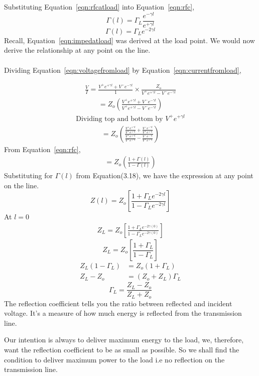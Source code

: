 Substituting Equation~\ref{eqn:rfcatload} into Equation~\ref{eqn:rfc},
\begin{equation*}
\Gamma (l) = \Gamma_L\frac{e^{-\gamma l}}{e^{+\gamma l}}
\end{equation*}
\begin{equation}
\Gamma (l) = \Gamma_L e^{-2\gamma l}
\end{equation}
Recall, Equation~\ref{eqn:impedatload} was derived at the load point. We would now derive the relationship at any point on the line. \\ \\
Dividing Equation~\ref{eqn:voltagefromload} by Equation~\ref{eqn:currentfromload},

\begin{align*}
\frac{V}{I} = \frac{V^+e^{+\gamma l}+V^-e^{-\gamma l}}{1}\times \frac{Z_o}{V^+e^{+\gamma l}-V^-e^{-\gamma l}}
\end{align*}
\begin{align*}
= Z_o\left( \frac{V^+e^{+\gamma l}+V^-e^{-\gamma l}}{V^+e^{+\gamma l}-V^-e^{-\gamma l}}\right) 
\end{align*}
\begin{align*}
\text{Dividing top and bottom by }V^+e^{+\gamma l}
\end{align*}
\begin{align*}
= Z_o\left( \frac{\frac{V^+e^{+\gamma l}}{V^+e^{+\gamma l}}+\frac{V^-e^{-\gamma l}}{V^+e^{+\gamma l}}}{\frac{V^+e^{+\gamma l}}{V^+e^{+\gamma l}}-\frac{V^-e^{-\gamma l}}{V^+e^{+\gamma l}}}\right) 
\end{align*}
From Equation~\ref{eqn:rfc},
\begin{align*}
=Z_o\left( \frac{1+\Gamma (l)}{1 -\Gamma (l)}\right) 
\end{align*}
Substituting for $\Gamma (l)$ from Equation(3.18), we have the expression at any point on the line.
\begin{equation}
Z(l) = Z_o\left[ \frac{1 + \Gamma_L e^{-2\gamma l}}{1 - \Gamma_L e^{-2\gamma l}}\right] 
\end{equation}
At $l = 0$ 
\begin{align*}
Z_L = Z_o\left[ \frac{1 + \Gamma_L e^{-2\gamma (0)}}{1 - \Gamma_L e^{-2\gamma (0)}}\right] 
\end{align*}
\begin{equation}
Z_L = Z_o\left[\frac{1 + \Gamma_L}{1 - \Gamma_L}\right] 
\end{equation}
\begin{align*}
Z_L(1 - \Gamma_L) &= Z_o(1 + \Gamma_L)\\
Z_L - Z_o &= (Z_o + Z_L)\Gamma_L
\end{align*}
\begin{equation}
\Gamma_L = \frac{Z_L - Z_o}{Z_L + Z_o}
\end{equation}
The reflection coefficient tells you the ratio between reflected and incident voltage. It's a measure of how much energy is reflected from the transmission line.

Our intention is always to deliver maximum energy to the load, we, therefore, want the reflection coefficient to be as small as possible. So we shall find the condition to deliver maximum power to the load i.e no reflection on the transmission line.